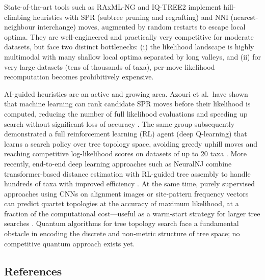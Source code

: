 \documentclass[11pt]{article}
\begin{document}
State-of-the-art tools such as RAxML-NG and IQ-TREE2 implement hill-climbing heuristics 
with SPR (subtree pruning and regrafting) and NNI (nearest-neighbour interchange) moves, 
augmented by random restarts to escape local optima. They are well-engineered and 
practically very competitive for moderate datasets, but face two distinct bottlenecks: 
(i) the likelihood landscape is highly multimodal with many shallow local optima 
separated by long valleys, and (ii) for very large datasets (tens of thousands of taxa), 
per-move likelihood recomputation becomes prohibitively expensive.

AI-guided heuristics are an active and growing area. Azouri et al.\ have shown that 
machine learning can rank candidate SPR moves before their likelihood is computed, 
reducing the number of full likelihood evaluations and speeding up search without 
significant loss of accuracy \cite{Azouri2021}. The same group subsequently demonstrated 
a full reinforcement learning (RL) agent (deep Q-learning) that learns a search 
policy over tree topology space, avoiding greedy uphill moves and reaching 
competitive log-likelihood scores on datasets of up to 20 taxa \cite{AzouriRL2024}.
More recently, end-to-end deep learning approaches such as NeuralNJ combine 
transformer-based distance estimation with RL-guided tree assembly to handle 
hundreds of taxa with improved efficiency \cite{NeuralNJ2025}.
At the same time, purely supervised approaches using CNNs on alignment images or 
site-pattern frequency vectors can predict quartet topologies at the accuracy of 
maximum likelihood, at a fraction of the computational cost---useful as a warm-start 
strategy for larger tree searches \cite{Suvorov2020}.
Quantum algorithms for tree topology search face a fundamental obstacle in encoding 
the discrete and non-metric structure of tree space; no competitive quantum approach 
exists yet.

\subsection*{References}
\end{document}
